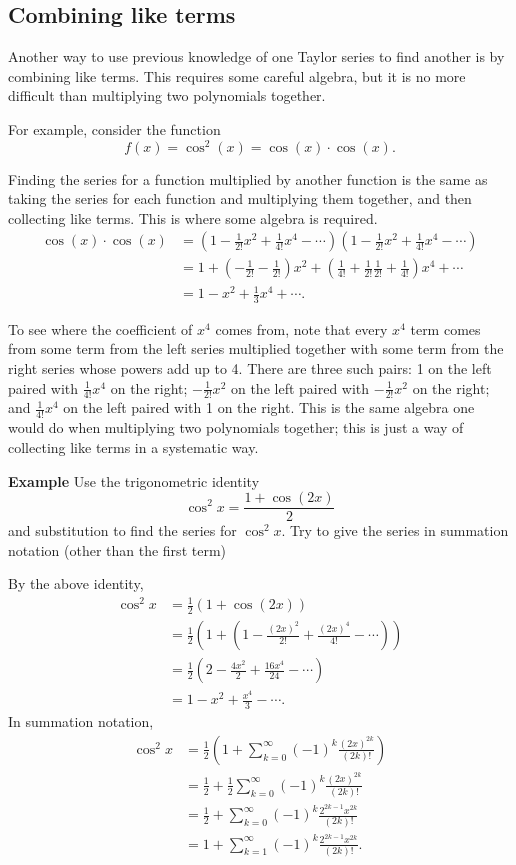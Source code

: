 \documentclass[twoside,openright,titlepage,a4paper]{book}
\begin{document}
\begin{sloppypar}
\subsection{Combining like terms}
Another way to use previous knowledge of one Taylor series to find another is by combining like terms. This requires some careful algebra, but it is no more difficult than multiplying two polynomials together. 

For example, consider the function \[f(x)=\cos^2(x)=\cos(x)\cdot\cos(x).\]

Finding the series for a function multiplied by another function is the same as taking the series for each function and multiplying them together, and then collecting like terms. This is where some algebra is required.
\begin{align*}
\cos(x)\cdot\cos(x)&=\left(1-\frac{1}{2!}x^2+\frac{1}{4!}x^4-\dotsb\right)\left(1-\frac{1}{2!}x^2+\frac{1}{4!}x^4-\dotsb\right) \\ 
&=1+\left(-\frac{1}{2!}-\frac{1}{2!}\right)x^2+\left(\frac{1}{4!}+\frac{1}{2!}\frac{1}{2!}+\frac{1}{4!}\right)x^4+\dotsb \\
&=1-x^2+\frac{1}{3}x^4+\dotsb.
\end{align*}

To see where the coefficient of $x^4$ comes from, note that every $x^4$ term comes from some term from the left series multiplied together with some term from the right series whose powers add up to 4. There are three such pairs: 1 on the left paired with ${\frac{1}{4!}x^4}$ on the right; ${-\frac{1}{2!}x^2}$ on the left paired with ${-\frac{1}{2!}x^2}$ on the right; and ${\frac{1}{4!}x^4}$ on the left paired with 1 on the right. This is the same algebra one would do when multiplying two polynomials together; this is just a way of collecting like terms in a systematic way.

\textbf{Example} Use the trigonometric identity \[\cos^2x=\frac{1+\cos(2x)}{2}\] and substitution to find the series for ${\cos^2x}$. Try to give the series in summation notation (other than the first term)
\begin{examplebox}
By the above identity,
\begin{align*}
\cos^2x &= \frac{1}{2} \left(1 + \cos(2x)\right) \\
&= \frac{1}{2} \left(1 + \left(1 - \frac{(2x)^2}{2!} + \frac{(2x)^4}{4!} - \dotsb \right)\right) \\
&= \frac{1}{2} \left(2 - \frac{4x^2}{2} + \frac{16x^4}{24} - \dotsb \right) \\
&= 1 - x^2 + \frac{x^4}{3} - \dotsb.
\end{align*}
In summation notation,
\begin{align*}
\cos^2x &= \frac{1}{2} \left(1 + \sum_{k=0}^\infty (-1)^k \frac{(2x)^{2k}}{(2k)!}\right)  \\
&= \frac{1}{2} + \frac{1}{2} \sum_{k=0}^\infty (-1)^k \frac{(2x)^{2k}}{(2k)!} \\
&= \frac{1}{2} + \sum_{k=0}^\infty (-1)^k \frac{2^{2k-1}x^{2k}}{(2k)!} \\
&= 1 + \sum_{k=1}^\infty (-1)^k \frac{2^{2k-1}x^{2k}}{(2k)!}.
\end{align*}
\end{examplebox}


\end{sloppypar}
\end{document}
